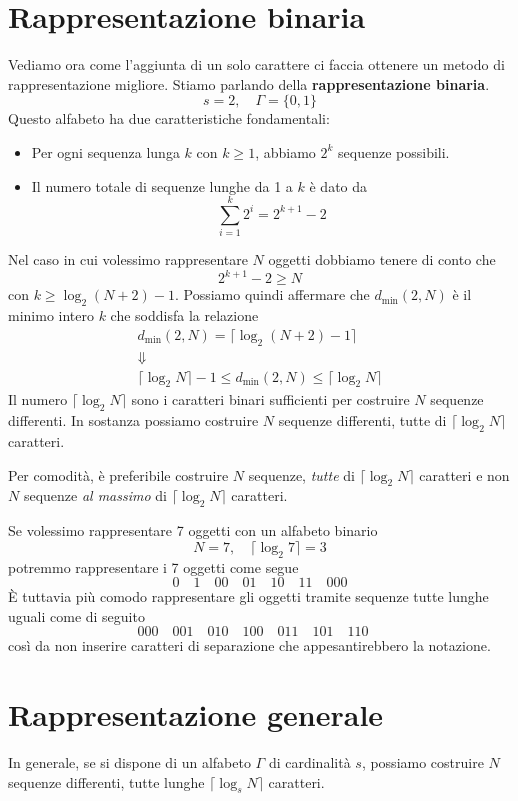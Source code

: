 \section{Rappresentazione binaria}\label{rappresentazione_binaria}
Vediamo ora come l'aggiunta di un solo carattere ci faccia ottenere un metodo di rappresentazione migliore. Stiamo
parlando della \textbf{rappresentazione binaria}.
\[ s = 2, \quad \Gamma = \{ 0, 1 \} \]
Questo alfabeto ha due caratteristiche fondamentali:
\begin{itemize}
	\item Per ogni sequenza lunga $k$ con $k \geq 1$, abbiamo $2^k$ sequenze possibili.
	\item Il numero totale di sequenze lunghe da 1 a $k$ \`e dato da
	      \[ \sum_{i = 1}^k 2^i = 2^{k + 1} - 2 \]
\end{itemize}
Nel caso in cui volessimo rappresentare $N$ oggetti dobbiamo tenere di conto che
\[ 2^{k + 1} - 2 \geq N \]
con $k \geq \log_2 (N + 2) - 1$. Possiamo quindi affermare che $d_{\min}(2, N)$ \`e il minimo intero $k$ che soddisfa
la relazione
\begin{gather*}
	d_{\min}(2, N) = \lceil \log_2 (N + 2) - 1 \rceil \\
	\Downarrow \\
	\lceil \log_2 N \rceil - 1 \leq d_{\min}(2, N) \leq \lceil \log_2 N \rceil
\end{gather*}
Il numero $\lceil \log_2 N \rceil$ sono i caratteri binari sufficienti per costruire $N$ sequenze differenti. In
sostanza possiamo costruire $N$ sequenze differenti, tutte di $\lceil \log_2 N \rceil$ caratteri.

Per comodit\`a, \`e preferibile costruire $N$ sequenze, \emph{tutte} di $\lceil \log_2 N \rceil$ caratteri e non $N$
sequenze \emph{al massimo} di $\lceil \log_2 N \rceil$ caratteri.

\begin{example}
	Se volessimo rappresentare 7 oggetti con un alfabeto binario
	\[ N = 7, \quad \lceil \log_2 7 \rceil = 3 \]
	potremmo rappresentare i 7 oggetti come segue
	\[
		0 \quad
		1 \quad
		00 \quad
		01 \quad
		10 \quad
		11 \quad
		000
	\]
	\`E tuttavia pi\`u comodo rappresentare gli oggetti tramite sequenze tutte lunghe uguali come di seguito
	\[
		000 \quad
		001 \quad
		010 \quad
		100 \quad
		011 \quad
		101 \quad
		110 \quad
	\]
	cos\`i da non inserire caratteri di separazione che appesantirebbero la notazione.
\end{example}

\section{Rappresentazione generale}\label{rappresentazione_generale}
In generale, se si dispone di un alfabeto $\Gamma$ di cardinalit\`a $s$, possiamo costruire $N$ sequenze differenti,
tutte lunghe $\lceil \log_s N \rceil$ caratteri.

